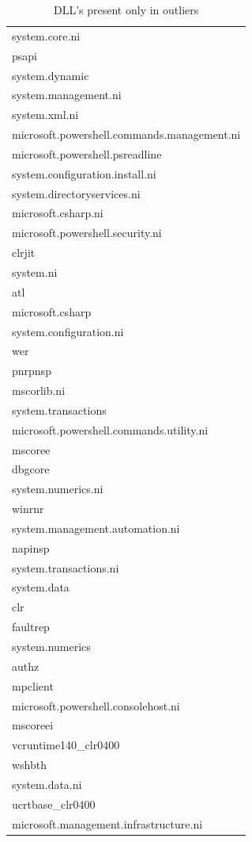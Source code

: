 \documentclass[a4paper,twoside,12pt]{book}
\begin{document}
\begin{table}
	\centering
	\caption{DLL's present only in outliers}
	\label{id:tab:outlierDLLs}
	\begin{tabular}{l}
		\toprule
										system.core.ni \\
												psapi \\
										system.dynamic \\
								system.management.ni \\
										system.xml.ni \\
			microsoft.powershell.commands.management.ni \\
						microsoft.powershell.psreadline \\
						system.configuration.install.ni \\
							system.directoryservices.ni \\
									microsoft.csharp.ni \\
					microsoft.powershell.security.ni \\
												clrjit \\
											system.ni \\
													atl \\
									microsoft.csharp \\
								system.configuration.ni \\
													wer \\
												pnrpnsp \\
											mscorlib.ni \\
									system.transactions \\
			microsoft.powershell.commands.utility.ni \\
												mscoree \\
												dbgcore \\
									system.numerics.ni \\
												winrnr \\
						system.management.automation.ni \\
												napinsp \\
								system.transactions.ni \\
											system.data \\
													clr \\
											faultrep \\
										system.numerics \\
												authz \\
											mpclient \\
					microsoft.powershell.consolehost.ni \\
											mscoreei \\
								vcruntime140\_clr0400 \\
												wshbth \\
										system.data.ni \\
									ucrtbase\_clr0400 \\
				microsoft.management.infrastructure.ni \\
		\bottomrule
	\end{tabular}
\end{table}
\end{document}
